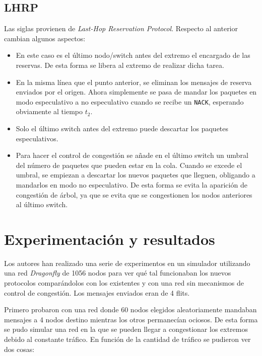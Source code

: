 \documentclass[11pt,a4paper]{article}
\begin{document}
\subsection{LHRP}

Las siglas provienen de \textit{Last-Hop Reservation Protocol}. Respecto al anterior cambian
algunos aspectos:

\begin{itemize}
	\item En este caso es el último nodo/switch antes del extremo el encargado de las reservas.
	De esta forma se libera al extremo de realizar dicha tarea.
	\item En la misma línea que el punto anterior, se eliminan los mensajes de reserva enviados
	por el origen. Ahora simplemente se pasa de mandar los paquetes en modo especulativo
	a no especulativo cuando se recibe un \texttt{NACK}, esperando obviamente al tiempo $t_2$.
	\item Solo el último switch antes del extremo puede descartar los paquetes especulativos.
	\item Para hacer el control de congestión se añade en el último switch un umbral del
	número de paquetes que pueden estar en la cola. Cuando se excede el umbral, se empiezan
	a descartar los nuevos paquetes que lleguen, obligando a mandarlos en modo no especulativo.	
	De esta forma se evita la aparición de congestión de árbol, ya que se evita que
	se congestionen los nodos anteriores al último switch.
\end{itemize}

\section{Experimentación y resultados}

Los autores han realizado una serie de experimentos en un simulador utilizando una red
\textit{Dragonfly} de 1056 nodos para ver qué tal funcionaban los nuevos protocolos comparándolos
con los existentes y con una red sin mecanismos de control de congestión. Los mensajes enviados
eran de 4 flits.

Primero probaron con una red donde 60 nodos elegidos aleatoriamente mandaban mensajes a 4 nodos
destino mientras los otros permanecían ociosos. De esta forma se pudo simular una red en la
que se pueden llegar a congestionar los extremos debido al constante tráfico. En función de
la cantidad de tráfico se pudieron ver dos cosas:
\end{document}
